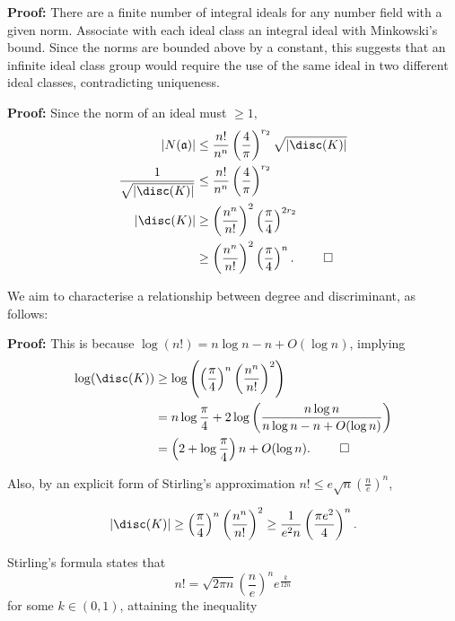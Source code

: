 \documentclass[a4paper, 12pt,oneside,openany]{book}
\begin{document}
\textbf{Proof:} There are a finite number of integral ideals for any number field with a given norm. Associate with each ideal class an integral ideal with Minkowski's bound. Since the norms are bounded above by a constant, this suggests that an infinite ideal class group would require the use of the same ideal in two different ideal classes, contradicting uniqueness.


\textbf{Proof:} Since the norm of an ideal must $\geq 1,$
\begin{align*}
    |N(\mathfrak{a})| &\leq \frac{n!}{n^n}\left(\frac{4}{\pi}\right)^{r_2}\sqrt{|\disc(K)|} \\
    \frac{1}{\sqrt{|\disc(K)|}} &\leq \frac{n!}{n^n}\left(\frac{4}{\pi}\right)^{r_2} \\
    |\disc(K)| &\geq \left(\frac{n^n}{n!}\right)^2\left(\frac{\pi}{4}\right)^{2r_2}\\
    &\geq\left(\frac{n^n}{n!}\right)^2\left(\frac{\pi}{4}\right)^n. \ \qed
\end{align*}

We aim to characterise a relationship between degree and discriminant, as follows:

 \textbf{Proof:} This is because $\log(n!)=n\log n-n + O(\log n)$, implying
\begin{align*}
    \log(\disc(K))&\geq \log\left(\left(\frac{\pi}{4}\right)^n\left(\frac{n^n}{n!}\right)^2\right)\\
    &=n\log\frac{\pi}{4}+2\log\left(\frac{n\log n}{n \log n - n+O(\log n)}\right)\\
    &= \left(2+\log\frac{\pi}{4}\right)n+O(\log n). \ \qed
\end{align*}

Also, by an explicit form of Stirling's approximation $n! \leq e \sqrt{n} \left(\frac{n}{e}\right)^n$, 

\begin{equation}
    |\disc(K)| \geq \left(\frac{\pi}{4}\right)^n\left(\frac{n^n}{n!}\right)^2 \geq \frac{1}{e^2n}\left(\frac{\pi e^2}{4}\right)^n.
\end{equation}

Stirling's formula states that $$n!=\sqrt{2\pi n}\left(\frac{n}{e}\right)^n e^{\frac{k}{12n}}$$ for some $k\in(0, 1)$, attaining the inequality 
\end{document}
